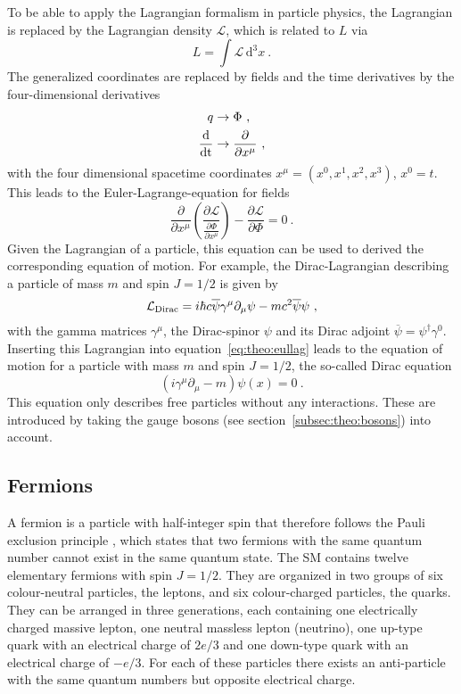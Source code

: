 \noindent To be able to apply the Lagrangian formalism in particle physics, the Lagrangian is replaced by the Lagrangian density $\mathcal{L}$, which is related to $L$ via
\begin{equation}
L=\int \! \mathcal{L} \, \mathrm{d}^3x ~.
\end{equation}
The generalized coordinates are replaced by fields and the time derivatives by the four-dimensional derivatives
\begin{align*}
q &\rightarrow \Phi ~, \\
\frac{\rm{d}}{\rm{dt}} &\rightarrow \frac{\partial}{\partial x^\mu} ~,
\end{align*}
with the four dimensional spacetime coordinates $x^\mu = (x^0,x^1,x^2,x^3)$, $x^0=t$. This leads to the Euler-Lagrange-equation for fields
\begin{equation}
\frac{\partial}{\partial x^\mu} \left( \frac{\partial \mathcal{L}}{\frac{\partial \Phi}{\partial x^\mu}} \right) - \frac{\partial \mathcal{L}}{\partial \Phi} = 0 ~. \label{eq:theo:eullag}
\end{equation}
Given the Lagrangian of a particle, this equation can be used to derived the corresponding equation of motion. For example, the Dirac-Lagrangian describing a particle of mass $m$ and spin $J=1/2$ is given by
\begin{equation}
\mathcal{L}_{\rm Dirac}=i\hbar c \overline{\psi} \gamma^\mu \partial_\mu \psi -  mc^2\overline{\psi}\psi ~, \label{eq:theo:diraclag}
\end{equation}
with the gamma matrices $\gamma^\mu$, the Dirac-spinor $\psi$ and its Dirac adjoint $\overline{\psi}=\psi^\dagger \gamma^0$. Inserting this Lagrangian into equation~\ref{eq:theo:eullag} leads to the equation of motion for a particle with mass $m$ and spin $J=1/2$, the so-called Dirac equation
\begin{equation}
\left(i\gamma^\mu\partial_\mu-m\right)\psi(x)=0 ~.
\end{equation}
This equation only describes free particles without any interactions. These are introduced by taking the gauge bosons (see section~\ref{subsec:theo:bosons}) into account.

\subsection{Fermions}
A fermion is a particle with half-integer spin that therefore follows the Pauli exclusion principle \cite{pauli}, which states that two fermions with the same quantum number cannot exist in the same quantum state. The SM contains twelve elementary fermions with spin $J=1/2$. They are organized in two groups of six colour-neutral particles, the leptons, and six colour-charged particles, the quarks. They can be arranged in three generations, each containing one electrically charged massive lepton, one neutral massless lepton (neutrino), one up-type quark with an electrical charge of $2e/3$ and one down-type quark with an electrical charge of $-e/3$. For each of these particles there exists an anti-particle with the same quantum numbers but opposite electrical charge.\\
 

